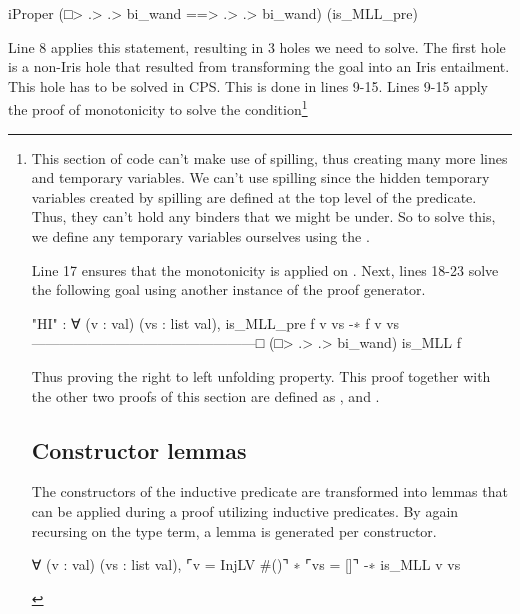 \documentclass[thesis.tex]{subfiles}
\begin{document}
\begin{coqcode}
  iProper (□> .> .> bi_wand ==> .> .> bi_wand) 
          (is_MLL_pre)
\end{coqcode}
Line 8 applies this statement, resulting in 3 holes we need to solve. The first hole is a non-Iris hole that resulted from transforming the goal into an Iris entailment. This hole has to be solved in CPS. This is done in lines 9-15. Lines 9-15 apply the proof of monotonicity to solve the  condition\footnote{This section of code can't make use of spilling, thus creating many more lines and temporary variables. We can't use spilling since the hidden temporary variables created by spilling are defined at the top level of the predicate. Thus, they can't hold any binders that we might be under. So to solve this, we define any temporary variables ourselves using the .

Line 17 ensures that the monotonicity is applied on . Next, lines 18-23 solve the following goal using another instance of the  proof generator.
\begin{coqcode}
  "HI" : ∀ (v : val) (vs : list val), 
          is_MLL_pre f v vs -∗ f v vs
  ------------------------------------------------□
  (□> .> .> bi_wand) is_MLL f
\end{coqcode}
Thus proving the right to left unfolding property. This proof together with the other two proofs of this section are defined as ,  and .

\section{Constructor lemmas}\label{sec:constrconstr}
The constructors of the inductive predicate are transformed into lemmas that can be applied during a proof utilizing inductive predicates. By again recursing on the type term, a lemma is generated per constructor.
\begin{coqcode}
  ∀ (v : val) (vs : list val),
    ⌜v = InjLV #()⌝ ∗ ⌜vs = []⌝ -∗ is_MLL v vs


\end{coqcode}}
\end{document}
